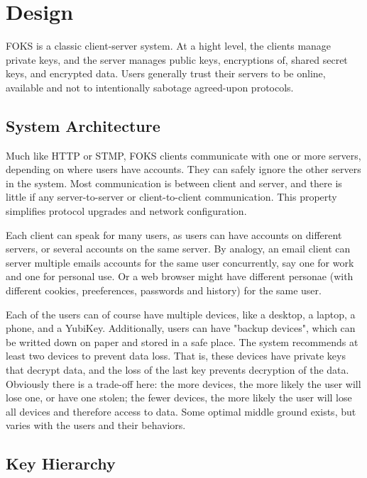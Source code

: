 
\section{Design}

FOKS is a classic client-server system. At a hight level, the clients
manage private keys, and the server manages public keys, encryptions of, 
shared secret keys, and encrypted data. Users generally trust their
servers to be online, available and not to intentionally sabotage
agreed-upon protocols. 

\subsection{System Architecture}

Much like HTTP or STMP, FOKS clients communicate with one or more servers,
depending on where users have accounts. They can safely ignore the other servers
in the system. Most communication is between client and server, and there is
little if any server-to-server or client-to-client communication.  This
property simplifies protocol upgrades and network configuration.

Each client can speak for many users, as users can have accounts on different
servers, or several accounts on the same server. By analogy, an email client can
server multiple emails accounts for the same user concurrently, say one for work
and one for personal use. Or a web browser might have different personae (with
different cookies, preeferences, passwords and history) for the same user.

Each of the users can of course have multiple devices, like a desktop, a laptop,
a phone, and a YubiKey. Additionally, users can have "backup devices", which can
be writted down on paper and stored in a safe place. The system recommends at
least two devices to prevent data loss. That is, these devices have private keys
that decrypt data, and the loss of the last key prevents decryption of the data.
Obviously there is a trade-off here: the more devices, the more likely the user
will lose one, or have one stolen; the fewer devices, the more likely the user
will lose all devices and therefore access to data. Some optimal middle ground
exists, but varies with the users and their behaviors. 

\subsection{Key Hierarchy}

